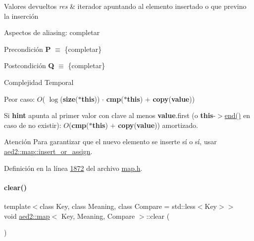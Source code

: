 \begin{DoxyRetVals}{Valores devueltos}
{\em res} & iterador apuntando al elemento insertado o que previno la inserción\\
\hline
\end{DoxyRetVals}
\begin{DoxyParagraph}{Aspectos de aliasing\+:}
completar
\end{DoxyParagraph}
\begin{DoxyPrecond}{Precondición}
{\bfseries P} $\equiv$ \{completar\} 
\end{DoxyPrecond}
\begin{DoxyPostcond}{Postcondición}
{\bfseries Q} $\equiv$ \{completar\}
\end{DoxyPostcond}

\begin{DoxyDescription}
\item[Complejidad Temporal]
\begin{DoxyItemize}
\item Peor caso\+: $O$( $\log$({\bfseries size}({\bfseries $\ast$this})) $\cdot$ {\bfseries cmp}({\bfseries $\ast$this}) $+$ {\bfseries copy}({\bfseries value}))
\item Si {\bfseries hint} apunta al primer valor con clave al menos {\bfseries value}.first (o {\bfseries this}-\/$>$\hyperlink{classaed2_1_1map_a76023e6a56cb625513e1b5ea028bf983_a76023e6a56cb625513e1b5ea028bf983}{end()} en caso de no existir)\+: $O$({\bfseries cmp}({\bfseries $\ast$this}) $+$ {\bfseries copy}({\bfseries value})) amortizado. 
\end{DoxyItemize}
\end{DoxyDescription}

\begin{DoxyAttention}{Atención}
Para garantizar que el nuevo elemento se inserte sí o sí, usar \hyperlink{classaed2_1_1map_a2ef6723c183916276b0afc4a4c721475_a2ef6723c183916276b0afc4a4c721475}{aed2\+::map\+::insert\+\_\+or\+\_\+assign}. 
\end{DoxyAttention}


Definición en la línea \hyperlink{map_8h_source_l01872}{1872} del archivo \hyperlink{map_8h_source}{map.\+h}.

\mbox{\label{classaed2_1_1map_a2bfa5165825979bf2431db55bc6bc9ca_a2bfa5165825979bf2431db55bc6bc9ca}} 
\paragraph{\texorpdfstring{clear()}{clear()}}
{\footnotesize\ttfamily template$<$class Key, class Meaning, class Compare = std\+::less$<$\+Key$>$$>$ \\
void \hyperlink{classaed2_1_1map}{aed2\+::map}$<$ Key, Meaning, Compare $>$\+::clear (\begin{DoxyParamCaption}{ }\end{DoxyParamCaption})\hspace{0.3cm}{\ttfamily [inline]}}



